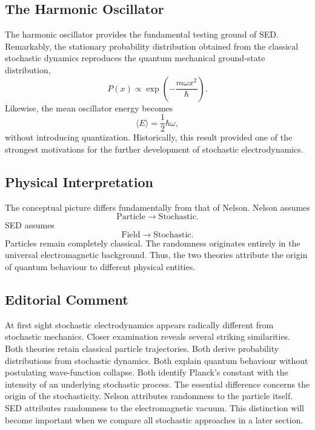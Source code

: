 \subsection{The Harmonic Oscillator}
The harmonic oscillator provides the fundamental testing ground of SED.
Remarkably,
the stationary probability distribution obtained from the classical
stochastic dynamics reproduces the quantum mechanical ground-state
distribution,
\[P(x)\propto\exp\left(-\frac{m\omega x^2}{\hbar}\right).\]
Likewise,
the mean oscillator energy becomes
\[\langle E\rangle=\frac12\hbar\omega,\]
without introducing quantization.
Historically,
this result provided one of the strongest motivations for the further
development of stochastic electrodynamics.
\subsection{Physical Interpretation}
The conceptual picture differs fundamentally from that of Nelson.
Nelson assumes
\[\text{Particle}\longrightarrow\text{Stochastic}.\]
SED assumes
\[\text{Field}\longrightarrow\text{Stochastic}.\]
Particles remain completely classical.
The randomness originates entirely in the universal electromagnetic
background.
Thus,
the two theories attribute the origin of quantum behaviour to different
physical entities.
\subsection*{Editorial Comment}
At first sight stochastic electrodynamics appears radically different
from stochastic mechanics.
Closer examination reveals several striking similarities.
Both theories retain classical particle trajectories.
Both derive probability distributions from stochastic dynamics.
Both explain quantum behaviour without postulating wave-function
collapse.
Both identify Planck's constant with the intensity of an underlying
stochastic process.
The essential difference concerns the origin of the stochasticity.
Nelson attributes randomness to the particle itself.
SED attributes randomness to the electromagnetic vacuum.
This distinction will become important when we compare all stochastic
approaches in a later section.

